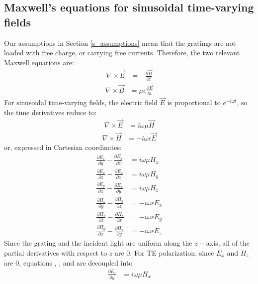 \subsection{Maxwell's equations for sinusoidal time-varying fields}
Our assumptions in Section \ref{s_assumptions} mean that the gratings are not loaded with free charge, or carrying free currents. Therefore, the two relevant Maxwell equations are:
\begin{align}
\nabla \times \vec E &= - \frac {\partial \vec B }{\partial t}
\end{align}
\begin{align}
\nabla \times \vec B &= \mu \epsilon \frac{ \partial \vec E }{ \partial t }
\end{align}
For sinusoidal time-varying fields, the electric field $\vec E$ is proportional to $e^{-i \omega t}$, so the time derivatives reduce to:
\begin{align}
\nabla \times \vec E &= i \omega \mu \vec H
\end{align}
\begin{align}
\nabla \times \vec H &= - i \omega \epsilon \vec E
\end{align}
or, expressed in Cartesian coordinates:
\begin{align}
\label{maxwellEqn1}
\frac{\partial E_z}{\partial y} - \frac{\partial E_y}{\partial z} &= i \omega \mu H_x  \\
\label{maxwellEqn2}
\frac{\partial E_x}{\partial z} - \frac{\partial E_z}{\partial x} &= i \omega \mu H_y  \\
\label{maxwellEqn3}
\frac{\partial E_y}{\partial x} - \frac{\partial E_x}{\partial y} &= i \omega \mu H_z  \\
\label{maxwellEqn4}
\frac{\partial H_z}{\partial y} - \frac{\partial H_y}{\partial z} &= -i \omega \epsilon E_x  \\
\label{maxwellEqn5}
\frac{\partial H_x}{\partial z} - \frac{\partial H_z}{\partial x} &= -i \omega \epsilon E_y \\
\label{maxwellEqn6}
\frac{\partial H_y}{\partial x} - \frac{\partial H_x}{\partial y} &= -i \omega \epsilon E_z
\end{align}
Since the grating and the incident light are uniform along the $z-$axis, all of the partial derivatives with respect to $z$ are 0.  For TE polarization, since $E_x$ and $H_z$ are 0, equations , , and  are decoupled into
\begin{align}
\frac{\partial E_z}{\partial y} &= i \omega \mu H_x
\label{mete1}
\end{align}
